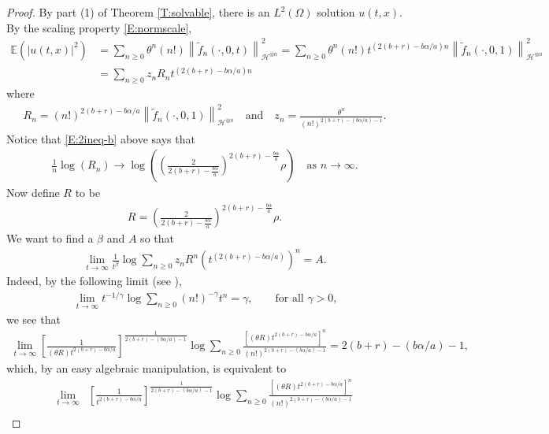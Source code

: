 \documentclass[12pt]{report}
\theoremstyle{plain}
\theoremstyle{definition}
\numberwithin{equation}{section}
\newcommand{\Norm}[1]{\left\|  #1   \right\|}
\begin{document}
\begin{proof}
	By part (1) of Theorem \ref{T:solvable}, there is an $L^2(\Omega)$ solution $u(t,x)$.  By the
	scaling property \eqref{E:normscale},
	\begin{align*}
	\mathbb{E}(|u(t,x)|^2)
	& = \sum_{n\ge 0}   \theta^n(n!)\Norm{\widetilde{f}_n(\cdot,0,t)}_{\mathcal{H}^{\otimes n}}^2
	= \sum_{n \ge 0}\theta^n(n!)t^{(2(b+r)-b\alpha/a)n}\Norm{\widetilde{f}_n(\cdot,0,1)}_{\mathcal{H}^{\otimes n}}^2 \\
	& = \sum_{n \ge 0} z_n R_nt^{(2(b+r)-b\alpha/a)n}
	\end{align*}
	where
	\begin{align*}
	R_n = (n!)^{2(b+r)-b\alpha/a}\Norm{\widetilde{f}_n(\cdot,0,1)}_{\mathcal{H}^{\otimes n}}^2 \quad \text{and} \quad
	z_n = \frac{\theta^n}{(n!)^{2(b+r)-(b\alpha/a)-1}}.
	\end{align*}
	Notice that \eqref{E:2ineq-b} above says that
	\begin{align*}
	\frac{1}{n}\log(R_n) \to  \log\left( \left(\frac{2}{2(b+r)-\frac{b\alpha}{a}}\right)^{2(b+r)-\frac{b\alpha}{a}}  \rho \right )  \quad \text{as } n\to \infty.
	\end{align*}
	Now define $R$ to be
	\begin{align*}
	R=\left(\frac{2}{2(b+r)-\frac{b\alpha}{a}}\right)^{2(b+r)-\frac{b\alpha}{a}} \rho.
	\end{align*}
	We want to find a $\beta$ and $A$ so that
	\begin{align*}
	\lim_{t \to \infty}\frac{1}{t^\beta} \log \sum_{n \ge 0} z_n R^n \left(t^{(2(b+r)-b\alpha/a)}\right)^n = A.
	\end{align*}
	Indeed, by the following limit (see \cite[Lemma A.3]{balan.chen.ea:22:exact}),
	\begin{align*}
	\lim_{t\to\infty} t^{-1/\gamma}\log\sum_{n\ge 0} (n!)^{-\gamma} t^n = \gamma, \qquad \text{for all $\gamma>0$,}
	\end{align*}
	we see that
	\begin{align*}
	\lim_{t\to \infty} \left[\frac{1}{(\theta
		R)t^{2(b+r)-b\alpha/a}}\right]^{\frac{1}{2(b+r)-(b\alpha/a)-1}} \log \sum_{n \ge 0} \frac{\left[ (\theta R) t^{2(b+r)-b\alpha/a}\right]^n}{(n!)^{2(b+r)-(b\alpha/a)-1}} = 2(b+r) - (b\alpha/a) -1,
	\end{align*}
	which, by an easy algebraic manipulation, is equivalent to
	\begin{align*}
	\lim_{t\to \infty}
	& \left[\frac{1}{t^{2(b+r)-b\alpha/a}}\right]^{\frac{1}{2(b+r)-(b\alpha/a)-1}} \log \sum_{n \ge 0} \frac{\left[ (\theta R) t^{2(b+r)-b\alpha/a}\right]^n}{(n!)^{2(b+r)-(b\alpha/a)-1}} \\

\end{align*}
\end{proof}
\end{document}
